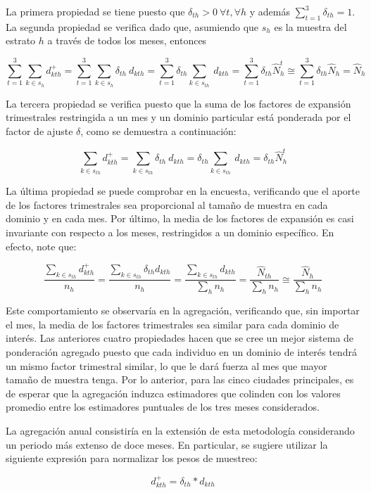 \documentclass[
  12pt,
]{book}
\begin{document}
La primera propiedad se tiene puesto que
\(\delta_{th} > 0 \ \forall t, \forall h\) y además
\(\sum_{t=1}^3 \delta_{th} = 1\). La segunda propiedad se verifica dado
que, asumiendo que \(s_{h}\) es la muestra del estrato \(h\) a través de
todos los meses, entonces

\[
\sum_{t=1}^3\sum_{k\in s_{h}} d_{kth}^{+}
=\sum_{t=1}^3\sum_{k\in s_h}\delta_{th}\ d_{kth}
=\sum_{t=1}^3\delta_{th}\sum_{k\in s_{th}}\ d_{kth} 
=\sum_{t=1}^3\delta_{th}\hat{N}_h^t 
\cong \sum_{t=1}^3\delta_{th}\hat{N}_h = \hat{N}_h
\]

La tercera propiedad se verifica puesto que la suma de los factores de
expansión trimestrales restringida a un mes y un dominio particular está
ponderada por el factor de ajuste \(\delta\), como se demuestra a
continuación:

\[
\sum_{k\in s_{th}} d_{kth}^{+}=\sum_{k\in s_{th}}\delta_{th}\ d_{kth}
=\delta_{th}\sum_{k\in s_{th}}\ d_{kth} 
=\delta_{th}\hat{N}_h^t
\]

La última propiedad se puede comprobar en la encuesta, verificando que el aporte de los factores trimestrales sea proporcional al tamaño de muestra en cada dominio y en cada mes. Por último, la media de los factores de expansión es casi invariante con
respecto a los meses, restringidos a un dominio específico. En efecto,
note que:

\[
\frac{\sum_{k\in s_{th}} d_{kth}^{+}}{n_{h}}
=\frac{\sum_{k\in s_{th}} \delta_{th} d_{kth}}{n_{h}}
=\frac{\sum_{k\in s_{th}} d_{kth}}{\sum_h n_h}
=\frac{\hat{N}_{th}}{\sum_h n_h}
\cong \frac{\hat{N}_{h}}{\sum_h n_h}
\]

Este comportamiento se observaría en la agregación, verificando que, sin importar el mes, la media de los factores trimestrales sea similar para cada dominio de interés. Las anteriores cuatro propiedades hacen que se cree un mejor sistema de
ponderación agregado puesto que cada individuo en un dominio de interés
tendrá un mismo factor trimestral similar, lo que le dará fuerza al mes
que mayor tamaño de muestra tenga. Por lo anterior, para las cinco
ciudades principales, es de esperar que la agregación induzca
estimadores que colinden con los valores promedio entre los estimadores
puntuales de los tres meses considerados.

La agregación anual consistiría en la extensión de esta metodología
considerando un periodo más extenso de doce meses. En particular, se sugiere utilizar la siguiente expresión para normalizar los pesos de muestreo:

\[
d_{kth}^{+}=\delta_{th}* d_{kth}
\]
\end{document}
